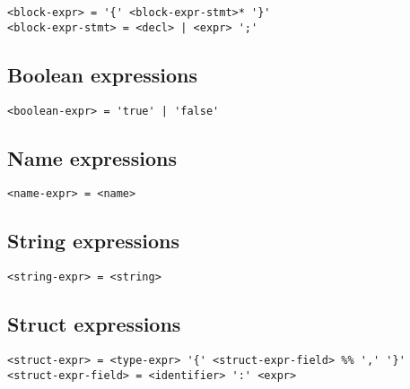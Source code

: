 \documentclass[12pt, oneside]{memoir}
\begin{document}
\begin{verbatim}
<block-expr> = '{' <block-expr-stmt>* '}'
<block-expr-stmt> = <decl> | <expr> ';'
\end{verbatim}

\subsection{Boolean expressions}

\begin{verbatim}
<boolean-expr> = 'true' | 'false'
\end{verbatim}

\subsection{Name expressions}

\begin{verbatim}
<name-expr> = <name>
\end{verbatim}

\subsection{String expressions}

\begin{verbatim}
<string-expr> = <string>
\end{verbatim}

\subsection{Struct expressions}

\begin{verbatim}
<struct-expr> = <type-expr> '{' <struct-expr-field> %% ',' '}'
<struct-expr-field> = <identifier> ':' <expr>
\end{verbatim}
\end{document}
